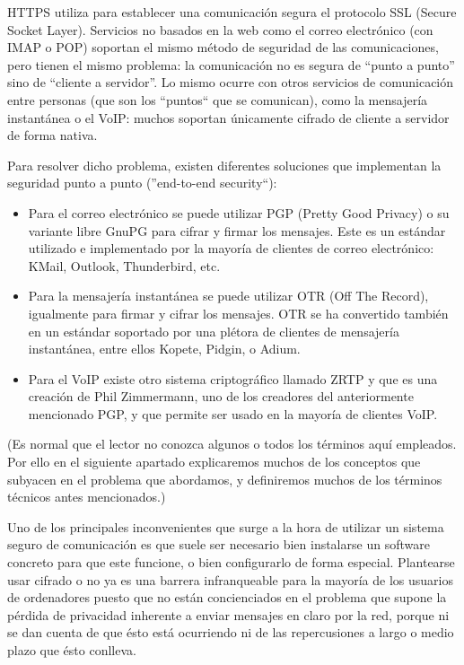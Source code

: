 HTTPS utiliza para establecer una comunicación segura el protocolo SSL (Secure Socket Layer). Servicios no basados en la web como el correo electrónico (con IMAP o POP) soportan el mismo método de seguridad de las comunicaciones, pero tienen el mismo problema: la comunicación no es segura de ``punto a punto'' sino de ``cliente a servidor''. Lo mismo ocurre con otros servicios de comunicación entre personas (que son los ``puntos`` que se comunican), como la mensajería instantánea o el VoIP: muchos soportan únicamente cifrado de cliente a servidor de forma nativa. 

Para resolver dicho problema, existen diferentes soluciones que implementan la seguridad punto a punto (''end-to-end security``):
\begin{itemize}
 \item Para el correo electrónico se puede utilizar PGP (Pretty Good Privacy) o su variante libre GnuPG para cifrar y firmar los mensajes. Este es un estándar utilizado e implementado por la mayoría de clientes de correo electrónico: KMail, Outlook, Thunderbird, etc.
 \item Para la mensajería instantánea se puede utilizar OTR (Off The Record), igualmente para firmar y cifrar los mensajes. OTR se ha convertido también en un estándar soportado por una plétora de clientes de mensajería instantánea, entre ellos Kopete, Pidgin, o Adium.
 \item Para el VoIP existe otro sistema criptográfico llamado ZRTP y que es una creación de Phil Zimmermann, uno de los creadores del anteriormente mencionado PGP, y que permite ser usado en la mayoría de clientes VoIP.
\end{itemize}

(Es normal que el lector no conozca algunos o todos los términos aquí empleados. Por ello en el siguiente apartado explicaremos muchos de los conceptos que subyacen en el problema que abordamos, y definiremos muchos de los términos técnicos antes mencionados.)

Uno de los principales inconvenientes que surge a la hora de utilizar un sistema seguro de comunicación es que suele ser necesario bien instalarse un software concreto para que este funcione, o bien configurarlo de forma especial. Plantearse usar cifrado o no ya es una barrera infranqueable para la mayoría de los usuarios de ordenadores puesto que no están concienciados en el problema que supone la pérdida de privacidad inherente a enviar mensajes en claro por la red, porque ni se dan cuenta de que ésto está ocurriendo ni de las repercusiones a largo o medio plazo que ésto conlleva.

